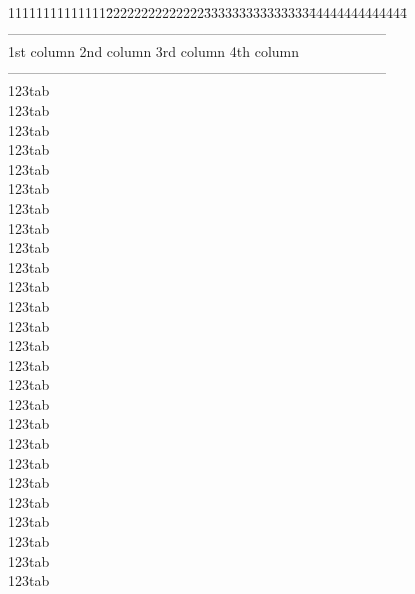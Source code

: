 \documentclass[phd]{ndsu-thesis-2022}
\begin{document}
\begingroup
\singlespacing
\begin{tabbing}
11111111111111\=22222222222222\=333333333333333\=44444444444444\=\kill
\>---------------------------------------------------------------------------------\\
\>\: 1st column  \>  2nd column  \>  3rd column \> 4th column\\
\>---------------------------------------------------------------------------------\\
\>\: 123tab      \\
\>\: 123tab      \\
\>\: 123tab      \\
\>\: 123tab      \\
\>\: 123tab      \\
\>\: 123tab      \\
\>\: 123tab      \\
\>\: 123tab      \\
\>\: 123tab      \\
\>\: 123tab      \\
\>\: 123tab      \\
\>\: 123tab      \\
\>\: 123tab    \\
\>\: 123tab    \\
\>\: 123tab    \\
\>\: 123tab    \\
\>\: 123tab    \\
\>\: 123tab    \\
\>\: 123tab    \\
\>\: 123tab    \\
\>\: 123tab    \\
\>\: 123tab    \\
\>\: 123tab    \\
\>\: 123tab    \\
\>\: 123tab    \\
\>\: 123tab    \\

\end{tabbing}
\end{document}
